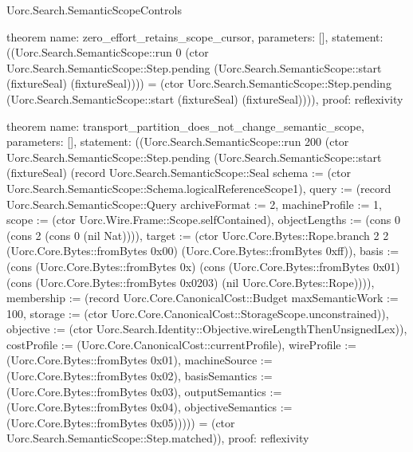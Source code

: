 \begin{lexlean}{Uorc.Search.SemanticScopeControls}
\begin{semanticmodule}
theorem{
  name: zero_effort_retains_scope_cursor,
  parameters: [],
  statement: ((Uorc.Search.SemanticScope::run 0 (ctor Uorc.Search.SemanticScope::Step.pending (Uorc.Search.SemanticScope::start (fixtureSeal) (fixtureSeal)))) = (ctor Uorc.Search.SemanticScope::Step.pending (Uorc.Search.SemanticScope::start (fixtureSeal) (fixtureSeal)))),
  proof: reflexivity{}
}

theorem{
  name: transport_partition_does_not_change_semantic_scope,
  parameters: [],
  statement: ((Uorc.Search.SemanticScope::run 200 (ctor Uorc.Search.SemanticScope::Step.pending (Uorc.Search.SemanticScope::start (fixtureSeal) (record Uorc.Search.SemanticScope::Seal {schema := (ctor Uorc.Search.SemanticScope::Schema.logicalReferenceScope1), query := (record Uorc.Search.SemanticScope::Query {archiveFormat := 2, machineProfile := 1, scope := (ctor Uorc.Wire.Frame::Scope.selfContained), objectLengths := (cons 0 (cons 2 (cons 0 (nil Nat)))), target := (ctor Uorc.Core.Bytes::Rope.branch 2 2 (Uorc.Core.Bytes::fromBytes 0x00) (Uorc.Core.Bytes::fromBytes 0xff)), basis := (cons (Uorc.Core.Bytes::fromBytes 0x) (cons (Uorc.Core.Bytes::fromBytes 0x01) (cons (Uorc.Core.Bytes::fromBytes 0x0203) (nil Uorc.Core.Bytes::Rope)))), membership := (record Uorc.Core.CanonicalCost::Budget {maxSemanticWork := 100, storage := (ctor Uorc.Core.CanonicalCost::StorageScope.unconstrained)}), objective := (ctor Uorc.Search.Identity::Objective.wireLengthThenUnsignedLex)}), costProfile := (Uorc.Core.CanonicalCost::currentProfile), wireProfile := (Uorc.Core.Bytes::fromBytes 0x01), machineSource := (Uorc.Core.Bytes::fromBytes 0x02), basisSemantics := (Uorc.Core.Bytes::fromBytes 0x03), outputSemantics := (Uorc.Core.Bytes::fromBytes 0x04), objectiveSemantics := (Uorc.Core.Bytes::fromBytes 0x05)})))) = (ctor Uorc.Search.SemanticScope::Step.matched)),
  proof: reflexivity{}
}


\end{semanticmodule}
\end{lexlean}
